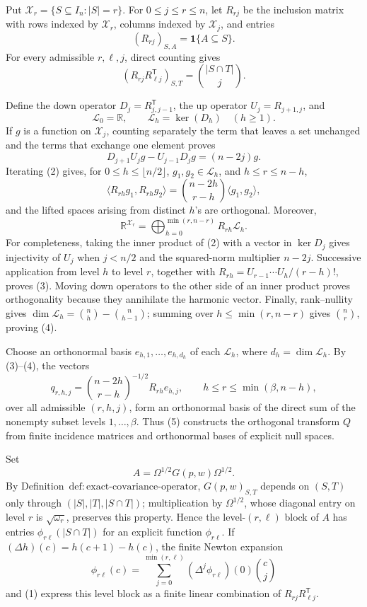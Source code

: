 Put \(\mathcal X_r=\{S\subseteq I_n:|S|=r\}\).  For \(0\le j\le r\le n\), let \(R_{rj}\) be the inclusion matrix with rows indexed by \(\mathcal X_r\), columns indexed by \(\mathcal X_j\), and entries
\[
(R_{rj})_{S,A}=\mathbf 1\{A\subseteq S\}.
\]
For every admissible \(r,\ell,j\), direct counting gives
\[
(R_{rj}R_{\ell j}^{\mathsf T})_{S,T}=\binom{|S\cap T|}{j}.
\tag{1}
\]

Define the down operator \(D_j=R_{j,j-1}^{\mathsf T}\), the up operator \(U_j=R_{j+1,j}\), and
\[
\mathcal L_0=\mathbb R,
\qquad
\mathcal L_h=\ker(D_h)\quad(h\ge1).
\]
If \(g\) is a function on \(\mathcal X_j\), counting separately the term that leaves a set unchanged and the terms that exchange one element proves
\[
D_{j+1}U_jg-U_{j-1}D_jg=(n-2j)g.
\tag{2}
\]
Iterating (2) gives, for \(0\le h\le\lfloor n/2\rfloor\), \(g_1,g_2\in\mathcal L_h\), and \(h\le r\le n-h\),
\[
\langle R_{rh}g_1,R_{rh}g_2\rangle
=\binom{n-2h}{r-h}\langle g_1,g_2\rangle,
\tag{3}
\]
and the lifted spaces arising from distinct \(h\)'s are orthogonal.  Moreover,
\[
\mathbb R^{\mathcal X_r}
=\bigoplus_{h=0}^{\min(r,n-r)}R_{rh}\mathcal L_h.
\tag{4}
\]
For completeness, taking the inner product of (2) with a vector in \(\ker D_j\) gives injectivity of \(U_j\) when \(j<n/2\) and the squared-norm multiplier \(n-2j\).  Successive application from level \(h\) to level \(r\), together with \(R_{rh}=U_{r-1}\cdots U_h/(r-h)!\), proves (3).  Moving down operators to the other side of an inner product proves orthogonality because they annihilate the harmonic vector.  Finally, rank--nullity gives \(\dim\mathcal L_h=\binom nh-\binom n{h-1}\); summing over \(h\le\min(r,n-r)\) gives \(\binom nr\), proving (4).

Choose an orthonormal basis \(e_{h,1},\ldots,e_{h,d_h}\) of each \(\mathcal L_h\), where \(d_h=\dim\mathcal L_h\).  By (3)--(4), the vectors
\[
q_{r,h,j}
=\binom{n-2h}{r-h}^{-1/2}R_{rh}e_{h,j},
\qquad
h\le r\le\min(\beta,n-h),
\tag{5}
\]
over all admissible \((r,h,j)\), form an orthonormal basis of the direct sum of the nonempty subset levels \(1,\ldots,\beta\).  Thus (5) constructs the orthogonal transform \(Q\) from finite incidence matrices and orthonormal bases of explicit null spaces.

Set
\[
A=\Omega^{1/2}G(p,w)\Omega^{1/2}.
\]
By Definition~\(\mathrm{def{:}exact\text{-}covariance\text{-}operator}\), \(G(p,w)_{S,T}\) depends on \((S,T)\) only through \((|S|,|T|,|S\cap T|)\); multiplication by \(\Omega^{1/2}\), whose diagonal entry on level \(r\) is \(\sqrt{\omega_r}\), preserves this property.  Hence the level-\((r,\ell)\) block of \(A\) has entries \(\phi_{r\ell}(|S\cap T|)\) for an explicit function \(\phi_{r\ell}\).  If \((\Delta h)(c)=h(c+1)-h(c)\), the finite Newton expansion
\[
\phi_{r\ell}(c)
=\sum_{j=0}^{\min(r,\ell)}(\Delta^j\phi_{r\ell})(0)\binom cj
\tag{6}
\]
and (1) express this level block as a finite linear combination of \(R_{rj}R_{\ell j}^{\mathsf T}\).

